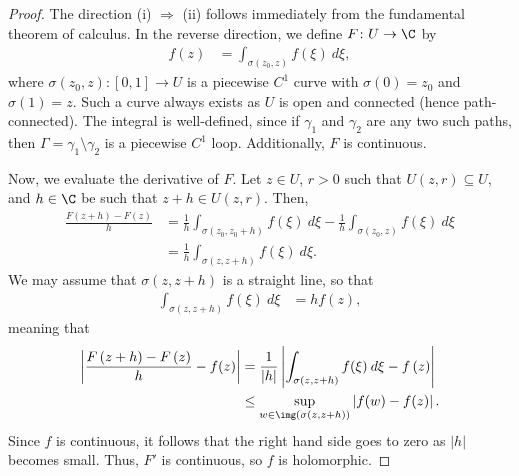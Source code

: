 \documentclass[10pt]{mypackage}
\begin{document}
\begin{proof}
  The direction (i) $\Rightarrow$ (ii) follows immediately from the fundamental theorem of calculus. In the reverse direction, we define $F\colon U\rightarrow \C$ by
  \begin{align*}
    f(z) &= \int_{\sigma\left( z_0,z \right)}^{} f\left( \xi \right)\:d\xi,
  \end{align*}
  where $\sigma\left( z_0,z \right)\colon [0,1]\rightarrow U$ is a piecewise $C^{1}$ curve with $\sigma(0) = z_0$ and $\sigma(1) = z$. Such a curve always exists as $U$ is open and connected (hence path-connected). The integral is well-defined, since if $\gamma_1$ and $\gamma_2$ are any two such paths, then $\Gamma = \gamma_1\setminus \gamma_2$ is a piecewise $C^1$ loop. Additionally, $F$ is continuous.%

  Now, we evaluate the derivative of $F$. Let $z\in U$, $r > 0$ such that $U\left( z,r \right)\subseteq U$, and $h\in \C$ be such that $z + h\in U\left( z,r \right)$. Then,
  \begin{align*}
    \frac{F\left( z+h \right) - F\left( z \right)}{h} &= \frac{1}{h} \int_{\sigma\left( z_0,z_0 + h \right)}^{} f\left( \xi \right)\:d\xi - \frac{1}{h} \int_{\sigma\left( z_0,z \right)}^{} f\left( \xi \right)\:d\xi\\
                                                      &= \frac{1}{h} \int_{\sigma\left( z,z+h \right)}^{} f\left( \xi \right)\:d\xi.
  \end{align*}
  We may assume that $\sigma\left( z,z+h \right)$ is a straight line, so that
  \begin{align*}
    \int_{\sigma\left( z,z+h \right)}^{} f\left( \xi \right)\:d\xi &= hf(z),
  \end{align*}
  meaning that
  \begin{align*}
    \left\vert \frac{F\left( z+h \right)-F\left( z \right)}{h} - f(z) \right\vert &= \frac{1}{\left\vert h \right\vert} \left\vert \int_{\sigma\left( z,z+h \right)}^{} f(\xi)\:d\xi - f\left( z \right) \right\vert\\
                                                                                  &\leq \sup_{w\in \img\left( \sigma\left( z,z+h \right) \right)} \left\vert f(w)-f(z) \right\vert.
  \end{align*}
  Since $f$ is continuous, it follows that the right hand side goes to zero as $\left\vert h \right\vert$ becomes small. Thus, $F'$ is continuous, so $f$ is holomorphic.
\end{proof}
\end{document}
